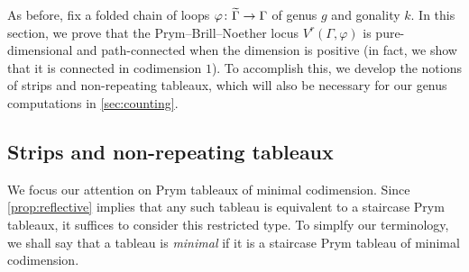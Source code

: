 \documentclass[11pt,reqno]{amsart}
\newcommand*{\maps}{\nobreak\mskip2mu\mathpunct{}\nonscript
  \mkern-\thinmuskip{:}\mskip6muplus1mu\relax}
\newcommand*{\wti}[1]{\widetilde{#1}}
\newcommand{\yoav}[1]{{\color{blue} \sf  Yo$\alpha$v: [#1]}}
\newcommand{\caelan}[1]{\textcolor{orange}{\sf C: [#1]}}
\newcommand{\steven}[1]{\textcolor{pink}{\sf S: [#1]}}
\theoremstyle{definition}
\theoremstyle{problem}
\theoremstyle{plain}
\theoremstyle{remark}
\theoremstyle{theorem}
\numberwithin{equation}{section}
\numberwithin{figure}{section}
\begin{document}
As before, fix a folded chain of loops
$\varphi\maps\wti\Gamma\to\Gamma$ of genus $g$ and gonality $k$.  In
this section, we prove that the Prym--Brill--Noether locus
$V^r(\Gamma,\varphi)$ is pure-dimensional and path-connected when the
dimension is positive (in fact, we show that it is connected in codimension $1$).  To accomplish this, we develop the notions of strips and non-repeating
tableaux, which will also be necessary for our genus computations in
\cref{sec:counting}.

\subsection{Strips and non-repeating tableaux}\label{sec:an-interl}
%


We focus our attention on Prym tableaux of minimal codimension.  Since
\cref{prop:reflective} implies that any such tableau is equivalent to a
staircase Prym tableaux, it suffices to consider this restricted type.
To simplfy our terminology, we shall say that a tableau is
\textit{minimal} if it is a staircase Prym tableau of minimal
codimension.
\end{document}
